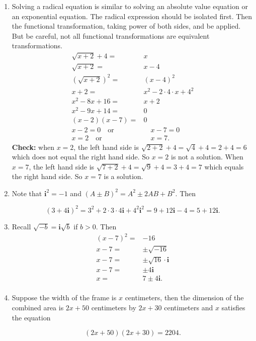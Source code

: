 \documentclass[
  12pt]{article}
\begin{document}
\begin{enumerate}
\def\labelenumi{\arabic{enumi}.}
\setcounter{enumi}{12}
\item
  Solving a radical equation is similar to solving an absolute value
  equation or an exponential equation. The radical expression should be
  isolated first. Then the functional transformation, taking power of
  both sides, and be applied. But be careful, not all functional
  transformations are equivalent transformations. \[
  \begin{aligned}
  \sqrt{x+2}+4=&x\\
  \sqrt{x+2}=&x-4\\
  (\sqrt{x+2})^2=&(x-4)^2\\
  x+2=&x^2-2\cdot 4\cdot x+4^2\\
  x^2-8x+16=&x+2\\
  x^2-9x+14=&0\\
  (x-2)(x-7)=&0\\
  x-2=0\quad\text{or}&\quad x-7=0\\
  x=2\quad\text{or}&\quad x=7.
  \end{aligned}
  \] \textbf{Check:} when \(x=2\), the left hand side is
  \(\sqrt{2+2}+4=\sqrt{4}+4=2+4=6\) which does not equal the right hand
  side. So \(x=2\) is not a solution. When \(x=7\), the left hand side
  is \(\sqrt{7+2}+4=\sqrt{9}+4=3+4=7\) which equals the right hand side.
  So \(x=7\) is a solution.
\item
  Note that \(\mathbf{i}^2=-1\) and \((A\pm B)^2=A^2\pm 2AB+B^2\). Then

  \[(3+4\mathbf{i})^2=3^2+2\cdot 3\cdot 4\mathbf{i}+4^2\mathbf{i}^2=9+12\mathbf{i}-4=5+12\mathbf{i}.\]
\item
  Recall \(\sqrt{-b}=\mathbf{i}\sqrt{b}\) if \(b>0\). Then \[
  \begin{aligned}
  (x-7)^2=&-16\\
  x-7=&\pm\sqrt{-16}\\
  x-7=&\pm\sqrt{16}\cdot\mathbf{i}\\
  x-7=&\pm4\mathbf{i}\\
  x=&7\pm4\mathbf{i}.\\
  \end{aligned}
  \]
\item
  Suppose the width of the frame is \(x\) centimeters, then the
  dimension of the combined area is \(2x+50\) centimeters by \(2x+30\)
  centimeters and \(x\) satisfies the equation

  \[(2x+50)(2x+30)=2204.\]


\end{enumerate}
\end{document}
